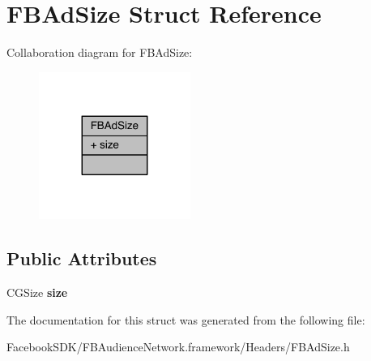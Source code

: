 \hypertarget{struct_f_b_ad_size}{\section{F\-B\-Ad\-Size Struct Reference}
\label{struct_f_b_ad_size}
}


Collaboration diagram for F\-B\-Ad\-Size\-:
\nopagebreak
\begin{figure}[H]
\begin{center}
\leavevmode
\includegraphics[width=140pt]{struct_f_b_ad_size__coll__graph}
\end{center}
\end{figure}
\subsection*{Public Attributes}
\begin{DoxyCompactItemize}
\item 
\hypertarget{struct_f_b_ad_size_aa993c30ebad9520b5d6b56f628aa4bea}{C\-G\-Size {\bfseries size}}\label{struct_f_b_ad_size_aa993c30ebad9520b5d6b56f628aa4bea}

\end{DoxyCompactItemize}


The documentation for this struct was generated from the following file\-:\begin{DoxyCompactItemize}
\item 
Facebook\-S\-D\-K/\-F\-B\-Audience\-Network.\-framework/\-Headers/F\-B\-Ad\-Size.\-h\end{DoxyCompactItemize}
